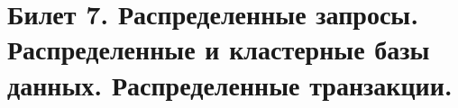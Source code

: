 \newpage
\section {Билет 7. Распределенные запросы. Распределенные и кластерные базы данных. Распределенные транзакции.}